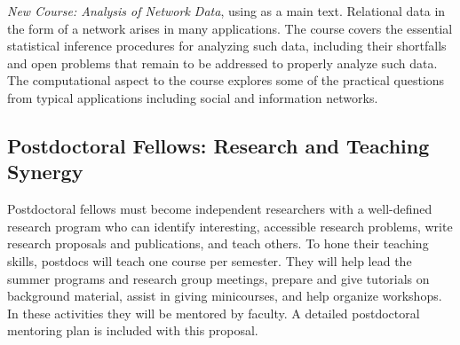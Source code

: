 \documentclass[11pt]{NSFamsart}
\begin{document}
\emph{New Course: Analysis of Network Data}, using \cite{KolaczykBook2017} as a main text. Relational data in the form of a network arises in many applications. The course covers the essential statistical inference procedures for analyzing such data, including their shortfalls and open problems that remain to be addressed to properly analyze such data. The computational aspect to the course explores some of the practical questions from  typical applications including  social and information networks. 


\subsection*{Postdoctoral Fellows: Research and Teaching Synergy}
Postdoctoral fellows must become independent researchers with a well-defined research program who can identify interesting, accessible research problems, write research proposals and publications, and teach others.  To hone their teaching skills, postdocs will teach one course per semester. They will help lead the summer programs and research group meetings, prepare and give tutorials on background material, assist in giving minicourses, and help organize workshops.  In these activities they will be mentored by faculty. A detailed postdoctoral mentoring plan is included with this proposal. %
\end{document}
